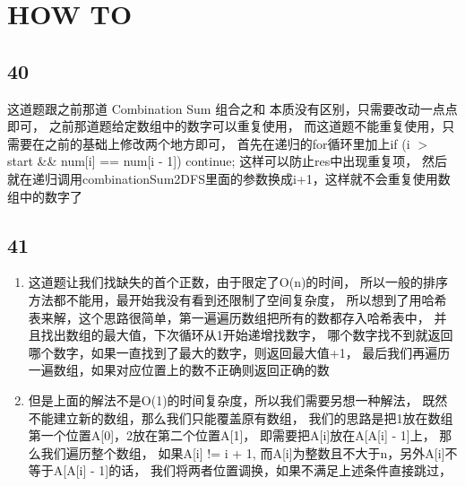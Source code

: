 \documentclass[12pt,a4paper]{article}
\begin{document}
\section{HOW TO}
\subsection{40}
\begin{CJK}{UTF8}{gbsn}
这道题跟之前那道 Combination Sum 组合之和 本质没有区别，只需要改动一点点即可，
之前那道题给定数组中的数字可以重复使用，
而这道题不能重复使用，只需要在之前的基础上修改两个地方即可，
首先在递归的for循环里加上if (i $>$ start \&\& num[i] == num[i - 1]) continue; 
这样可以防止res中出现重复项，
然后就在递归调用combinationSum2DFS里面的参数换成i+1，这样就不会重复使用数组中的数字了
\end{CJK}
\subsection{41}
\begin{enumerate}
\item
\begin{CJK}{UTF8}{gbsn}
这道题让我们找缺失的首个正数，由于限定了O(n)的时间，
所以一般的排序方法都不能用，最开始我没有看到还限制了空间复杂度，
所以想到了用哈希表来解，这个思路很简单，第一遍遍历数组把所有的数都存入哈希表中，
并且找出数组的最大值，下次循环从1开始递增找数字，
哪个数字找不到就返回哪个数字，如果一直找到了最大的数字，则返回最大值+1，
最后我们再遍历一遍数组，如果对应位置上的数不正确则返回正确的数
\end{CJK}
\item
\begin{CJK}{UTF8}{gbsn}
但是上面的解法不是O(1)的时间复杂度，所以我们需要另想一种解法，
既然不能建立新的数组，那么我们只能覆盖原有数组，
我们的思路是把1放在数组第一个位置A[0]，2放在第二个位置A[1]，
即需要把A[i]放在A[A[i] - 1]上，
那么我们遍历整个数组，
如果A[i] != i + 1, 而A[i]为整数且不大于n，另外A[i]不等于A[A[i] - 1]的话，
我们将两者位置调换，如果不满足上述条件直接跳过，
\end{CJK}
\end{enumerate}
\end{document}
